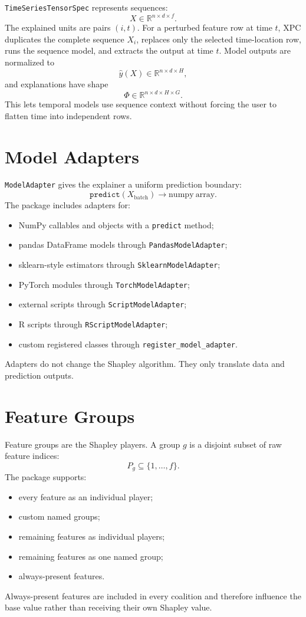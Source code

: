 \documentclass[11pt]{article}
\newcommand{\code}[1]{\texttt{#1}}
\begin{document}
\code{TimeSeriesTensorSpec} represents sequences:
\[
X \in \mathbb{R}^{n \times d \times f}.
\]
The explained units are pairs \((i,t)\).  For a perturbed feature row at time
\(t\), XPC duplicates the complete sequence \(X_i\), replaces only the selected
time-location row, runs the sequence model, and extracts the output at time
\(t\).  Model outputs are normalized to
\[
\hat{y}(X) \in \mathbb{R}^{n \times d \times H},
\]
and explanations have shape
\[
\Phi \in \mathbb{R}^{n \times d \times H \times G}.
\]
This lets temporal models use sequence context without forcing the user to
flatten time into independent rows.

\section{Model Adapters}

\code{ModelAdapter} gives the explainer a uniform prediction boundary:
\[
\code{predict}(X_{\mathrm{batch}}) \rightarrow \mathrm{numpy\ array}.
\]
The package includes adapters for:
\begin{itemize}
  \item NumPy callables and objects with a \code{predict} method;
  \item pandas DataFrame models through \code{PandasModelAdapter};
  \item sklearn-style estimators through \code{SklearnModelAdapter};
  \item PyTorch modules through \code{TorchModelAdapter};
  \item external scripts through \code{ScriptModelAdapter};
  \item R scripts through \code{RScriptModelAdapter};
  \item custom registered classes through \code{register\_model\_adapter}.
\end{itemize}
Adapters do not change the Shapley algorithm.  They only translate data and
prediction outputs.

\section{Feature Groups}

Feature groups are the Shapley players.  A group \(g\) is a disjoint subset of
raw feature indices:
\[
P_g \subseteq \{1,\dots,f\}.
\]
The package supports:
\begin{itemize}
  \item every feature as an individual player;
  \item custom named groups;
  \item remaining features as individual players;
  \item remaining features as one named group;
  \item always-present features.
\end{itemize}
Always-present features are included in every coalition and therefore influence
the base value rather than receiving their own Shapley value.
\end{document}
